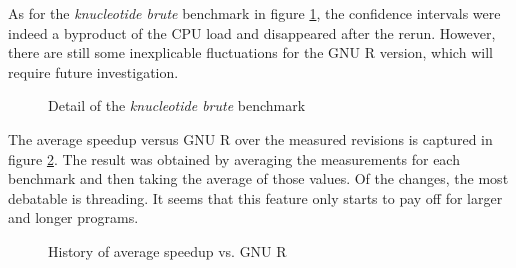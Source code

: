 As for the \emph{knucleotide brute} benchmark in figure \ref{fig:knucleotide}, the confidence intervals were indeed a byproduct of the CPU load and disappeared after the rerun. However, there are still some inexplicable fluctuations for the GNU R version, which will require future investigation.

\begin{figure}[htbp]
  \caption{\label{fig:knucleotide}Detail of the \emph{knucleotide brute} benchmark}
  \centering
\end{figure}

The average speedup versus GNU R over the measured revisions is captured in figure \ref{fig:avg-speedup-history}. The result was obtained by averaging the measurements for each benchmark and then taking the average of those values. Of the changes, the most debatable is threading. It seems that this feature only starts to pay off for larger and longer programs.

\begin{figure}[htbp]
  \caption{\label{fig:avg-speedup-history}History of average speedup vs. GNU R}
  \centering
\end{figure}

